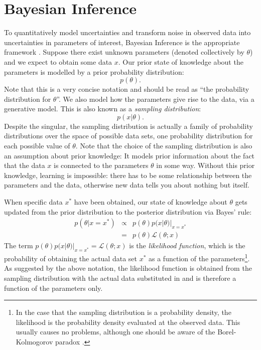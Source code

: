 \documentclass[manuscript]{aastex}
\begin{document}
\section{Bayesian Inference}
To quantitatively model uncertainties and transform noise in observed data
into uncertainties in parameters of interest, Bayesian Inference is the appropriate
framework \citep{cox, jaynes, caticha}. Suppose there exist unknown parameters
(denoted
collectively by $\theta$) and we expect to obtain some data $x$. Our prior
state of knowledge about the parameters is modelled by a prior
probability distribution:
\begin{equation}
p(\theta).
\end{equation}
Note that this is a very concise notation \citep{hogg} and should be read
as ``the probability distribution for $\theta$''.
We also model how the parameters give rise to the data, via a generative model.
This is also known as a {\it sampling distribution}:
\begin{equation}
p(x|\theta).
\end{equation}
Despite the singular, the sampling distribution is actually a family of
probability distributions over the space of possible data sets, one probability
distribution for each possible value
of $\theta$. Note that the choice of
the sampling distribution is also an assumption about prior knowledge:
It models prior information about the fact that the data $x$ is connected to
the parameters $\theta$ in some way. Without this prior knowledge, learning is
impossible: there has to be some relationship between the parameters and the
data, otherwise new data tells you about nothing but itself.

When specific data $x^*$ have been obtained, our state of knowledge about $\theta$
gets updated from the prior distribution to the posterior distribution
via Bayes' rule:
\begin{eqnarray}
p(\theta|x=x^*) &\propto& p(\theta)p(x|\theta)|_{x=x^*} \\
&=& p(\theta)\mathcal{L}(\theta; x)
\end{eqnarray}
The term $p(\theta)p(x|\theta)|_{x=x^*} = \mathcal{L}(\theta; x)$
is the {\it likelihood function}, which is the 
probability of obtaining the actual data set $x^*$ as a function of the
parameters\footnote{In the case that the sampling distribution is a probability
density, the likelihood is the probability density evaluated at the observed
data. This usually causes no problems, although one should be aware of the
Borel-Kolmogorov paradox \citep{jaynes}.}.
As suggested by the above notation, the likelihood function is obtained from the
sampling distribution with the actual data substituted in and is therefore
a function of the parameters only.
\end{document}
